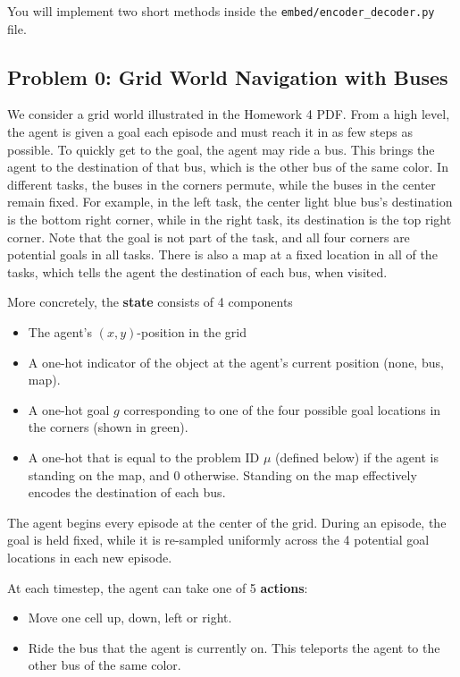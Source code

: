 \documentclass[12pt]{article}
\begin{document}
You will implement two short methods inside the \texttt{embed/encoder\_decoder.py} file.

\subsection*{Problem 0: Grid World Navigation with Buses}

We consider a grid world illustrated in the Homework 4 PDF.
From a high level, the agent is given a goal each episode and must reach it in as few steps as possible.
To quickly get to the goal, the agent may ride a bus.
This brings the agent to the destination of that bus, which is the other bus of the same color.
In different tasks, the buses in the corners permute, while the buses in the center remain fixed.
For example, in the left task, the center light blue bus's destination is the bottom right corner, while in the right task, its destination is the top right corner.
Note that the goal is not part of the task, and all four corners are potential goals in all tasks.
There is also a map at a fixed location in all of the tasks, which tells the agent the destination of each bus, when visited.

More concretely, the \textbf{state} consists of 4 components
\begin{itemize}
    \item The agent's $(x, y)$-position in the grid
    \item A one-hot indicator of the object at the agent's current position (none, bus, map).
    \item A one-hot goal $g$ corresponding to one of the four possible goal locations in the corners (shown in green).
    \item A one-hot that is equal to the problem ID $\mu$ (defined below) if the agent is standing on the map, and $0$ otherwise. Standing on the map effectively encodes the destination of each bus.
\end{itemize}

The agent begins every episode at the center of the grid.
During an episode, the goal is held fixed, while it is re-sampled uniformly across the 4 potential goal locations in each new episode.

At each timestep, the agent can take one of 5 \textbf{actions}:
\begin{itemize}
    \item Move one cell up, down, left or right.
    \item Ride the bus that the agent is currently on. This teleports the agent to the other bus of the same color.
\end{itemize}
\end{document}
